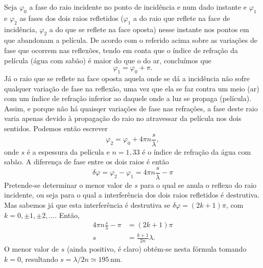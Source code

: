 Seja $\varphi_0$ a fase do raio incidente no ponto de incidência e num dado
instante e $\varphi_1$ e $\varphi_2$ as fases dos dois raios refletidos
($\varphi_1$ a do raio que reflete na face de incidência, $\varphi_2$ a do que
se reflete na face oposta) nesse instante nos pontos em que abandonam a
película. De acordo com o referido acima sobre as variações de fase que ocorrem
nas reflexões, tendo em conta que o índice de refração da película (água com
sabão) é maior do que o do ar, concluímos que 
\begin{equation*}
\varphi_1=\varphi_0+\pi.
\end{equation*}
Já o raio que se reflete na face oposta aquela onde se dá a incidência não sofre
qualquer variação de fase na reflexão, uma vez que ela se faz contra um meio
(ar) com um índice de refração inferior ao daquele onde a luz se propaga
(película). Assim, e porque não há quaisqer variações de fase nas refrações, a
fase deste raio varia apenas devido à propagação do raio no atravessar da
película nos dois sentidos. Podemos então escrever
\begin{equation*}
\varphi_2= \varphi_0+4\pi n\frac{s}{\lambda},
\end{equation*}
onde $s$ é a espessura da película e $n=1,33$ é o índice de refração da água com
sabão. A diferença de fase entre os dois raios é então
\begin{equation*}
\delta\varphi = \varphi_2-\varphi_1=4\pi n\frac{s}{\lambda}-\pi
\end{equation*}
Pretende-se determinar o menor valor de $s$ para o qual se anula o reflexo do
raio incidente, ou seja para o qual a interferência dos dois raios refletidos é
destrutiva. Mas sabemos já que esta interferência é destrutiva se
$\delta\varphi=(2k+1)\pi$, com $k=0,\pm1,\pm2,\ldots$. Então,
\begin{align*}
4\pi n\frac{s}{\lambda}-\pi&=(2k+1)\pi\\
s&=\frac{k+1}{2n}\lambda.
\end{align*}
O menor valor de $s$ (ainda positivo, é claro) obtém-se nesta fórmula tomando
$k=0$, resultando $s=\lambda/2n\simeq 195$\,nm.

